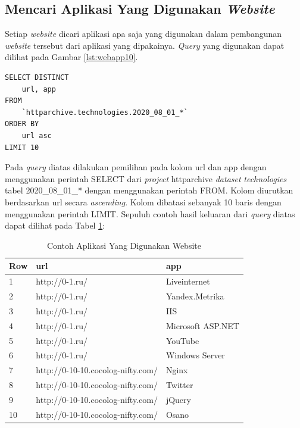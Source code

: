 \subsection{Mencari Aplikasi Yang Digunakan \textit{Website}}
Setiap \textit{website} dicari aplikasi apa saja yang digunakan dalam pembangunan \textit{website} tersebut dari aplikasi yang dipakainya. \textit{Query} yang digunakan dapat dilihat pada Gambar \ref{lst:webapp10}.
\begin{lstlisting}[caption={Mencari Aplikasi yang Digunakan Website Limit 10}, label={lst:webapp10}]
SELECT DISTINCT 
	url, app
FROM 
	`httparchive.technologies.2020_08_01_*`
ORDER BY 
	url asc
LIMIT 10
\end{lstlisting}

Pada \textit{query} diatas dilakukan pemilihan pada kolom url dan app dengan menggunakan perintah SELECT dari \textit{project} httparchive \textit{dataset} \textit{technologies} tabel 2020\_08\_01\_* dengan menggunakan perintah FROM. Kolom diurutkan berdasarkan url secara \textit{ascending}. Kolom dibatasi sebanyak 10 baris dengan menggunakan perintah LIMIT. Sepuluh contoh hasil keluaran dari \textit{query} diatas dapat dilihat pada Tabel \ref{table:contoh_langkah2}:

\begin{table}[H]
\centering
\begin{tabular}{|l|l|l|}
	\hline
	\textbf{Row} & \textbf{url} & \textbf{app}\\
	\hline
	1 & http://0-1.ru/ & Liveinternet\\
	\hline
	2 & http://0-1.ru/ & Yandex.Metrika\\
	\hline
	3 & http://0-1.ru/ & IIS\\
	\hline
	4 & http://0-1.ru/ & Microsoft ASP.NET\\
	\hline
	5 & http://0-1.ru/ & YouTube\\
	\hline
	6 & http://0-1.ru/ & Windows Server\\
	\hline
	7 & 	
	http://0-10-10.cocolog-nifty.com/  & 	
	Nginx \\
	\hline
	8 & 	
	http://0-10-10.cocolog-nifty.com/  & Twitter\\
	\hline
	9 & 	
	http://0-10-10.cocolog-nifty.com/  & jQuery\\
	\hline
	10 & 	
	http://0-10-10.cocolog-nifty.com/  & Osano\\
	\hline
\end{tabular}
\caption{Contoh Aplikasi Yang Digunakan Website}
\label{table:contoh_langkah2}
\end{table}

